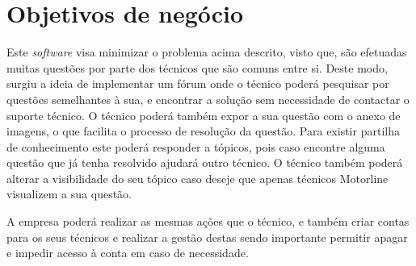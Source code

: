 \section{Objetivos de negócio}

Este \textit{software} visa minimizar o problema acima descrito, visto que, são efetuadas muitas questões por parte dos técnicos que são comuns entre si. Deste modo, surgiu a ideia de implementar um fórum onde o técnico poderá pesquisar por questões semelhantes à sua, e encontrar a solução sem necessidade de contactar o suporte técnico. O técnico poderá também expor a sua questão com o anexo de imagens, o que facilita o processo de resolução da questão. Para existir partilha de conhecimento este poderá responder a tópicos, pois caso encontre alguma questão que já tenha resolvido ajudará outro técnico. O técnico também poderá alterar a visibilidade do seu tópico caso deseje que apenas técnicos Motorline visualizem a sua questão.

A empresa poderá realizar as mesmas ações que o técnico, e também criar contas para os seus técnicos e realizar a gestão destas sendo importante permitir apagar e impedir acesso à conta em caso de necessidade.

